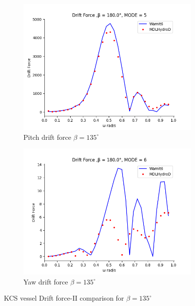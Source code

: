 \begin{figure}[H]
    \centering
    \begin{subfigure}[b]{0.45\textwidth}
        \includegraphics[width=\textwidth]{plots/kcs/drift/DrtFrc_12MODE_5.png}
        \caption{Pitch drift force $\beta = 135^{\circ}$}
    \end{subfigure}
    \begin{subfigure}[b]{0.45\textwidth}
        \includegraphics[width=\textwidth]{plots/kcs/drift/DrtFrc_12MODE_6.png}
        \caption{Yaw drift force $\beta = 135^{\circ}$}
    \end{subfigure}
    \caption{KCS vessel Drift force-II comparison for $\beta= 135^{\circ}$}
    \label{fig:kcs_drift_135_2}
\end{figure}
